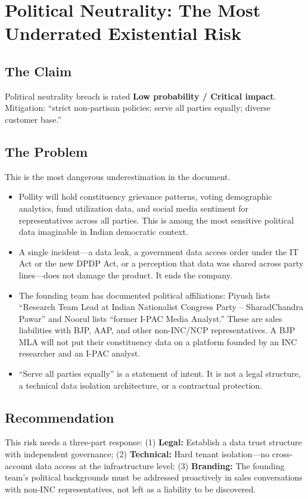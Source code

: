 \documentclass[12pt, a4paper]{article}
\begin{document}
\section{Political Neutrality: The Most Underrated Existential Risk}

\subsection{The Claim}
Political neutrality breach is rated \textbf{Low probability / Critical impact}. Mitigation: ``strict non-partisan policies; serve all parties equally; diverse customer base.''

\subsection{The Problem}

This is the most dangerous underestimation in the document.

\begin{itemize}[leftmargin=1.5em]
    \item Pollity will hold constituency grievance patterns, voting demographic analytics, fund utilization data, and social media sentiment for representatives across all parties. This is among the most sensitive political data imaginable in Indian democratic context.
    \item A single incident---a data leak, a government data access order under the IT Act or the new DPDP Act, or a perception that data was shared across party lines---does not damage the product. It ends the company.
    \item The founding team has documented political affiliations: Piyush lists ``Research Team Lead at Indian Nationalist Congress Party -- SharadChandra Pawar'' and Noorul lists ``former I-PAC Media Analyst.'' These are sales liabilities with BJP, AAP, and other non-INC/NCP representatives. A BJP MLA will not put their constituency data on a platform founded by an INC researcher and an I-PAC analyst.
    \item ``Serve all parties equally'' is a statement of intent. It is not a legal structure, a technical data isolation architecture, or a contractual protection.
\end{itemize}

\subsection{Recommendation}
This risk needs a three-part response: (1) \textbf{Legal:} Establish a data trust structure with independent governance; (2) \textbf{Technical:} Hard tenant isolation---no cross-account data access at the infrastructure level; (3) \textbf{Branding:} The founding team's political backgrounds must be addressed proactively in sales conversations with non-INC representatives, not left as a liability to be discovered.
\end{document}
